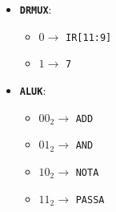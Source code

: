 \begin{minipage}{0.35\linewidth}
\begin{itemize}
            \item \textbf{\texttt{DRMUX}}:
                \begin{itemize}
                    \item $0 \rightarrow$ \texttt{IR[11:9]}
                    \item $1 \rightarrow$ \texttt{7}
                \end{itemize}
        \fi
        \item \textbf{\texttt{ALUK}}:
            \begin{itemize}
                \item ${00}_2 \rightarrow$ \texttt{ADD}
                \item ${01}_2 \rightarrow$ \texttt{AND}
                \item ${10}_2 \rightarrow$ \texttt{NOTA}
                \item ${11}_2 \rightarrow$ \texttt{PASSA}
            \end{itemize}
    \end{itemize}
\end{minipage}
\hspace{1em}
